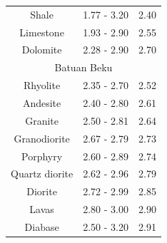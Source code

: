 \begin{table}[h]
{\begin{tabular}{ccc}
		Shale          & 1.77 - 3.20                                                        & 2.40                                                                 \\
		Limestone      & 1.93 - 2.90                                                        & 2.55                                                                 \\
		Dolomite       & 2.28 - 2.90                                                        & 2.70                                                                 \\ \hline
		\multicolumn{3}{c}{Batuan Beku}                                                                                                                            \\ \hline
		Rhyolite       & 2.35 - 2.70                                                        & 2.52                                                                 \\
		Andesite       & 2.40 - 2.80                                                        & 2.61                                                                 \\
		Granite        & 2.50 - 2.81                                                        & 2.64                                                                 \\
		Granodiorite   & 2.67 - 2.79                                                        & 2.73                                                                 \\
		Porphyry       & 2.60 - 2.89                                                        & 2.74                                                                 \\
		Quartz diorite & 2.62 - 2.96                                                        & 2.79                                                                 \\
		Diorite        & 2.72 - 2.99                                                        & 2.85                                                                 \\
		Lavas          & 2.80 - 3.00                                                        & 2.90                                                                 \\
		Diabase        & 2.50 - 3.20                                                        & 2.91                                                                 \\

\end{tabular}}
\end{table}
